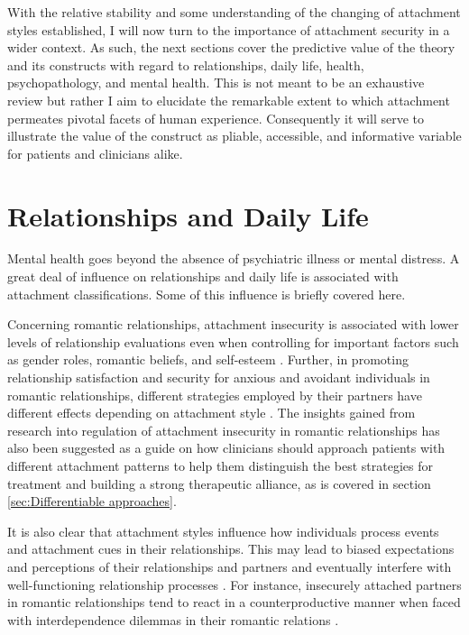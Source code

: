 \documentclass[12pt]{report}
\begin{document}
With the relative stability and some understanding of the changing of attachment styles established, I will now turn to the importance of attachment security in a wider context. As such, the next sections cover the predictive value of the theory and its constructs with regard to relationships, daily life, health, psychopathology, and mental health. This is not meant to be an exhaustive review but rather I aim to elucidate the remarkable extent to which attachment permeates pivotal facets of human experience. Consequently it will serve to illustrate the value of the construct as pliable, accessible, and informative variable for patients and clinicians alike.

\section{Relationships and Daily Life}
Mental health goes beyond the absence of psychiatric illness or mental distress. A great deal of influence on relationships and daily life is associated with attachment classifications. Some of this influence is briefly covered here.

Concerning romantic relationships, attachment insecurity is associated with lower levels of relationship evaluations even when controlling for important factors such as gender roles, romantic beliefs, and self-esteem \cite{Rodriguez2021, Jones1996}.
Further, in promoting relationship satisfaction and security for anxious and avoidant individuals in romantic relationships, different strategies employed by their partners have different effects depending on attachment style \cite{Overall2015}.
The insights gained from research into regulation of attachment insecurity in romantic relationships has also been suggested as a guide on how clinicians should approach patients with different attachment patterns to help them distinguish the best strategies for treatment and building a strong therapeutic alliance, as is covered in section \ref{sec:Differentiable approaches}.

It is also clear that attachment styles influence how individuals process events and attachment cues in their relationships. This may lead to biased expectations and perceptions of their relationships and partners and eventually interfere with well-functioning relationship processes \cite{Collins2007, Collins2004, Hazan1994, Mikulincer2003, Rodriguez2019}.
For instance, insecurely attached partners in romantic relationships tend to react in a counterproductive manner when faced with interdependence dilemmas in their romantic relations \cite{Simpson2012}.
\end{document}
